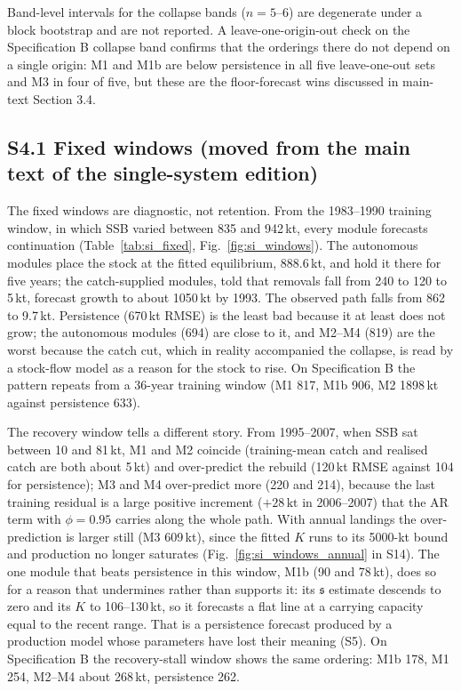 \documentclass[preprint,11pt,authoryear]{elsarticle}
\theoremstyle{remark}
\newcommand{\kt}{\,\mathrm{kt}}
\newcommand{\sA}{\mathfrak{s}}
\begin{document}
Band-level intervals for the collapse bands ($n=5$--6) are degenerate under a block bootstrap and are not reported. A leave-one-origin-out check on the Specification B collapse band confirms that the orderings there do not depend on a single origin: M1 and M1b are below persistence in all five leave-one-out sets and M3 in four of five, but these are the floor-forecast wins discussed in main-text Section 3.4.

\FloatBarrier
\subsection*{S4.1 Fixed windows (moved from the main text of the single-system edition)}

The fixed windows are diagnostic, not retention. From the 1983--1990 training window, in which SSB varied between 835 and 942\,kt, every module forecasts continuation (Table~\ref{tab:si_fixed}, Fig.~\ref{fig:si_windows}). The autonomous modules place the stock at the fitted equilibrium, 888.6\,kt, and hold it there for five years; the catch-supplied modules, told that removals fall from 240 to 120 to 5\,kt, forecast growth to about 1050\,kt by 1993. The observed path falls from 862 to 9.7\,kt. Persistence (670\,kt RMSE) is the least bad because it at least does not grow; the autonomous modules (694) are close to it, and M2--M4 (819) are the worst because the catch cut, which in reality accompanied the collapse, is read by a stock-flow model as a reason for the stock to rise. On Specification B the pattern repeats from a 36-year training window (M1 817, M1b 906, M2 1898\,kt against persistence 633).

The recovery window tells a different story. From 1995--2007, when SSB sat between 10 and 81\,kt, M1 and M2 coincide (training-mean catch and realised catch are both about 5\,kt) and over-predict the rebuild (120\,kt RMSE against 104 for persistence); M3 and M4 over-predict more (220 and 214), because the last training residual is a large positive increment ($+28\kt$ in 2006--2007) that the AR term with $\phi=0.95$ carries along the whole path. With annual landings the over-prediction is larger still (M3 609\,kt), since the fitted $K$ runs to its 5000-kt bound and production no longer saturates (Fig.~\ref{fig:si_windows_annual} in S14). The one module that beats persistence in this window, M1b (90 and 78\,kt), does so for a reason that undermines rather than supports it: its $\sA$ estimate descends to zero and its $K$ to 106--130\,kt, so it forecasts a flat line at a carrying capacity equal to the recent range. That is a persistence forecast produced by a production model whose parameters have lost their meaning (S5). On Specification B the recovery-stall window shows the same ordering: M1b 178, M1 254, M2--M4 about 268\,kt, persistence 262.
\end{document}
